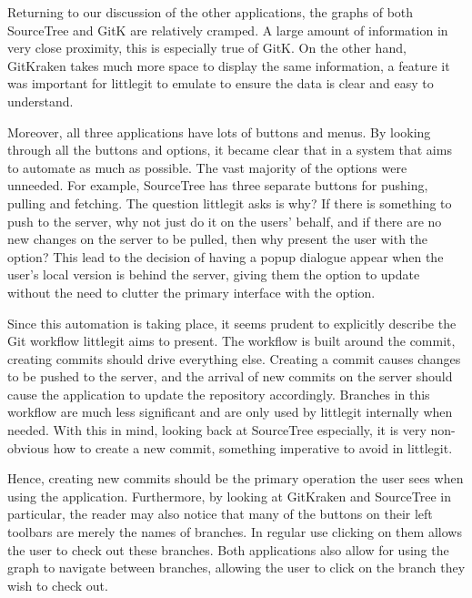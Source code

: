 
Returning to our discussion of the other applications, the graphs of both SourceTree and GitK are relatively cramped. A large amount of information in very close proximity, this is especially true of GitK. On the other hand, GitKraken takes much more space to display the same information, a feature it was important for littlegit to emulate to ensure the data is clear and easy to understand.

Moreover, all three applications have lots of buttons and menus. By looking through all the buttons and options, it became clear that in a system that aims to automate as much as possible. The vast majority of the options were unneeded. For example, SourceTree has three separate buttons for pushing, pulling and fetching. The question littlegit asks is why? If there is something to push to the server, why not just do it on the users' behalf, and if there are no new changes on the server to be pulled, then why present the user with the option? This lead to the decision of having a popup dialogue appear when the user's local version is behind the server, giving them the option to update without the need to clutter the primary interface with the option.

Since this automation is taking place, it seems prudent to explicitly describe the Git workflow littlegit aims to present. The workflow is built around the commit, creating commits should drive everything else. Creating a commit causes changes to be pushed to the server, and the arrival of new commits on the server should cause the application to update the repository accordingly. Branches in this workflow are much less significant and are only used by littlegit internally when needed. With this in mind, looking back at SourceTree especially, it is very non-obvious how to create a new commit, something imperative to avoid in littlegit. 

Hence, creating new commits should be the primary operation the user sees when using the application. Furthermore, by looking at GitKraken and SourceTree in particular, the reader may also notice that many of the buttons on their left toolbars are merely the names of branches. In regular use clicking on them allows the user to check out these branches. Both applications also allow for using the graph to navigate between branches, allowing the user to click on the branch they wish to check out. 

